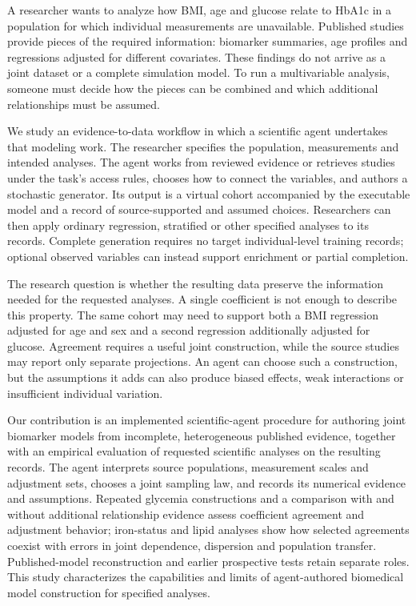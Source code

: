 \documentclass[11pt,letterpaper]{article}
\begin{document}
A researcher wants to analyze how BMI, age and glucose relate to HbA1c in a population for which individual measurements are unavailable. Published studies provide pieces of the required information: biomarker summaries, age profiles and regressions adjusted for different covariates. These findings do not arrive as a joint dataset or a complete simulation model. To run a multivariable analysis, someone must decide how the pieces can be combined and which additional relationships must be assumed.


We study an evidence-to-data workflow in which a scientific agent undertakes that modeling work. The researcher specifies the population, measurements and intended analyses. The agent works from reviewed evidence or retrieves studies under the task's access rules, chooses how to connect the variables, and authors a stochastic generator. Its output is a virtual cohort accompanied by the executable model and a record of source-supported and assumed choices. Researchers can then apply ordinary regression, stratified or other specified analyses to its records. Complete generation requires no target individual-level training records; optional observed variables can instead support enrichment or partial completion.


The research question is whether the resulting data preserve the information needed for the requested analyses. A single coefficient is not enough to describe this property. The same cohort may need to support both a BMI regression adjusted for age and sex and a second regression additionally adjusted for glucose. Agreement requires a useful joint construction, while the source studies may report only separate projections. An agent can choose such a construction, but the assumptions it adds can also produce biased effects, weak interactions or insufficient individual variation.


Our contribution is an implemented scientific-agent procedure for authoring joint biomarker models from incomplete, heterogeneous published evidence, together with an empirical evaluation of requested scientific analyses on the resulting records. The agent interprets source populations, measurement scales and adjustment sets, chooses a joint sampling law, and records its numerical evidence and assumptions. Repeated glycemia constructions and a comparison with and without additional relationship evidence assess coefficient agreement and adjustment behavior; iron-status and lipid analyses show how selected agreements coexist with errors in joint dependence, dispersion and population transfer. Published-model reconstruction and earlier prospective tests retain separate roles. This study characterizes the capabilities and limits of agent-authored biomedical model construction for specified analyses.
\end{document}
